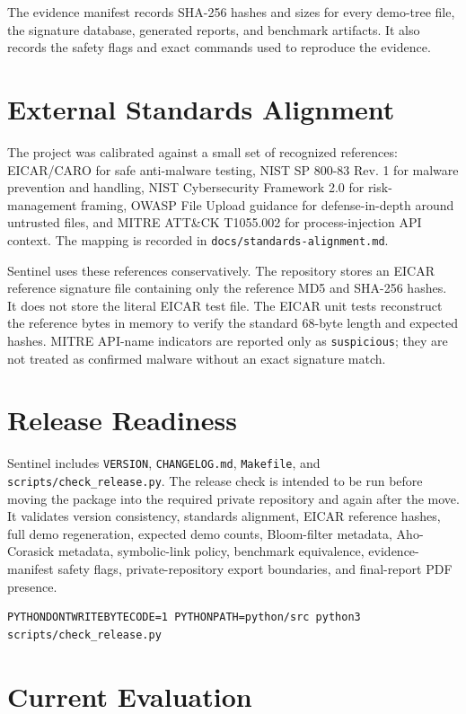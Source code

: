 \documentclass[11pt]{article}
\begin{document}
The evidence manifest records SHA-256 hashes and sizes for every demo-tree file,
the signature database, generated reports, and benchmark artifacts. It also
records the safety flags and exact commands used to reproduce the evidence.

\section{External Standards Alignment}

The project was calibrated against a small set of recognized references:
EICAR/CARO for safe anti-malware testing, NIST SP 800-83 Rev. 1 for malware
prevention and handling, NIST Cybersecurity Framework 2.0 for risk-management
framing, OWASP File Upload guidance for defense-in-depth around untrusted files,
and MITRE ATT\&CK T1055.002 for process-injection API context. The mapping is
recorded in \texttt{docs/standards-alignment.md}.

Sentinel uses these references conservatively. The repository stores an EICAR
reference signature file containing only the reference MD5 and SHA-256 hashes. It
does not store the literal EICAR test file. The EICAR unit tests reconstruct the
reference bytes in memory to verify the standard 68-byte length and expected
hashes. MITRE API-name indicators are reported only as \texttt{suspicious}; they
are not treated as confirmed malware without an exact signature match.

\section{Release Readiness}

Sentinel includes \texttt{VERSION}, \texttt{CHANGELOG.md}, \texttt{Makefile},
and \texttt{scripts/check\_release.py}. The release check is intended to be run
before moving the package into the required private repository and again after
the move. It validates version consistency, standards alignment, EICAR reference
hashes, full demo regeneration, expected demo counts, Bloom-filter metadata,
Aho-Corasick metadata, symbolic-link policy, benchmark equivalence,
evidence-manifest safety flags, private-repository export boundaries, and
final-report PDF presence.

\begin{lstlisting}[style=sentinel]
PYTHONDONTWRITEBYTECODE=1 PYTHONPATH=python/src python3 scripts/check_release.py
\end{lstlisting}

\section{Current Evaluation}
\end{document}
